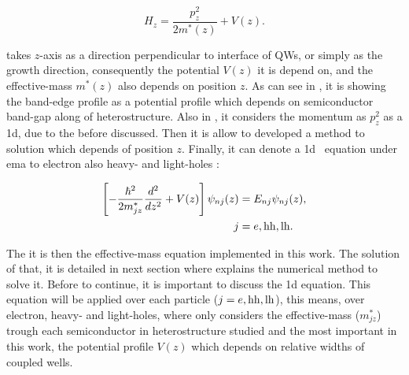 \begin{equation}\label{eqn:chapter-2-sec-numerical-calculations-ema-hamiltonian}
	H_{z} = \dfrac{p_{z}^{2}}{2m^{*}(z)}+V(z).
\end{equation}

 takes $z$-axis as a direction perpendicular to interface of QWs, or simply as the growth direction, consequently the potential $V(z)$ it is depend on, and the effective-mass $m^{*}(z)$ also depends on position $z$. As can see in , it is showing the band-edge profile as a potential profile which depends on semiconductor band-gap along of heterostructure.  Also in , it considers the momentum as $p_{z}^{2}$ as a \gls{1d}, due to the before discussed. Then it is allow to developed a method to solution which depends of position $z$. Finally, it can denote a \gls{1d} \sch\, equation under \gls{ema} to electron also heavy- and light-holes : 

\begin{equation}\label{eqn:chapter-2-sec-numerical-calculations-ema-schrodinger}
	\begin{split}
	\left[-\dfrac{\hbar^2}{2m_{jz}^{*}}\dfrac{d^2}{dz^2}+V(z) \right]\psi_{nj}(z)&= E_{nj}\psi_{nj}(z),\\
	                                                               j&=e,\mathrm{hh},\mathrm{lh}.
	\end{split}
\end{equation}

The  it is then the effective-mass equation implemented in this work. The solution of that, it is detailed in next section where explains the numerical method to solve it. Before to continue, it is important to discuss the \gls{1d} equation. This equation will be applied over each particle ($j=e,\mathrm{hh},\mathrm{lh}$), this means, over electron, heavy- and light-holes, where only considers the effective-mass ($m_{jz}^{*}$) trough each semiconductor in heterostructure studied and the most important in this work, the potential profile $V(z)$ which depends on relative widths of coupled wells. 


